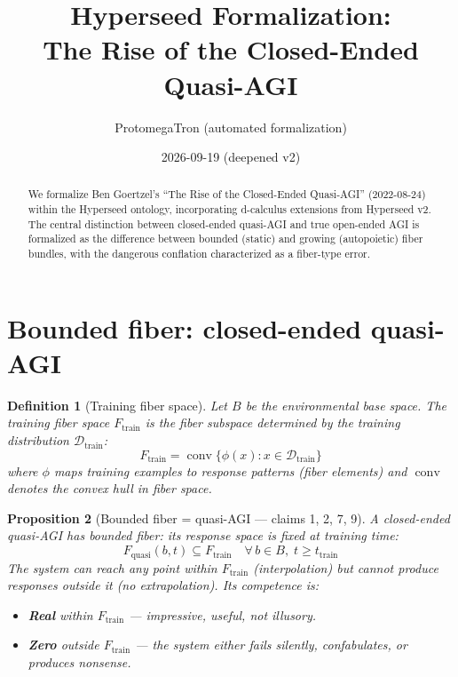\documentclass[11pt,a4paper]{article}
\title{Hyperseed Formalization:\\
  The Rise of the Closed-Ended Quasi-AGI}
\author{ProtomegaTron (automated formalization)}
\date{2026-09-19 (deepened v2)}
\newtheorem{definition}{Definition}[section]
\newtheorem{proposition}[definition]{Proposition}
\begin{document}
\maketitle

\begin{abstract}
We formalize Ben Goertzel's ``The Rise of the Closed-Ended Quasi-AGI''
(2022-08-24) within the Hyperseed ontology, incorporating d-calculus
extensions from Hyperseed v2. The central distinction between closed-ended
quasi-AGI and true open-ended AGI is formalized as the difference between
bounded (static) and growing (autopoietic) fiber bundles, with the
dangerous conflation characterized as a fiber-type error.
\end{abstract}

\tableofcontents

\section{Bounded fiber: closed-ended quasi-AGI}

\begin{definition}[Training fiber space]
Let $B$ be the environmental base space. The \emph{training fiber space}
$F_{\text{train}}$ is the fiber subspace determined by the training
distribution $\mathcal{D}_{\text{train}}$:
\[
  F_{\text{train}} = \operatorname{conv}\{\phi(x) : x \in \mathcal{D}_{\text{train}}\}
\]
where $\phi$ maps training examples to response patterns (fiber elements)
and $\operatorname{conv}$ denotes the convex hull in fiber space.
\end{definition}

\begin{proposition}[Bounded fiber = quasi-AGI --- claims 1, 2, 7, 9]
\label{prop:bounded}
A closed-ended quasi-AGI has \emph{bounded fiber}: its response space is
fixed at training time:
\[
  F_{\text{quasi}}(b, t) \subseteq F_{\text{train}} \quad \forall\, b \in B,\; t \geq t_{\text{train}}
\]
The system can reach any point within $F_{\text{train}}$ (interpolation)
but cannot produce responses outside it (no extrapolation). Its competence
is:
\begin{itemize}
  \item \textbf{Real} within $F_{\text{train}}$ --- impressive, useful, not illusory.
  \item \textbf{Zero} outside $F_{\text{train}}$ --- the system either fails
    silently, confabulates, or produces nonsense.
\end{itemize}
\end{proposition}
\end{document}
